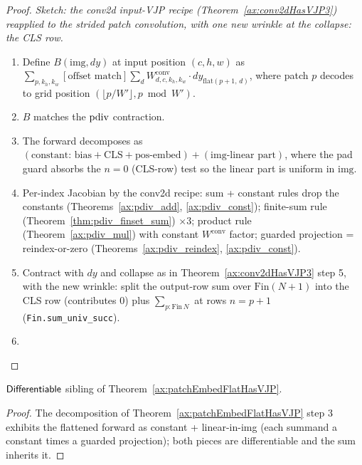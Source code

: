 \begin{proof}
\leanok
\emph{Sketch: the conv2d input-VJP recipe
(Theorem~\ref{ax:conv2dHasVJP3}) reapplied to the strided patch
convolution, with one new wrinkle at the collapse: the CLS row.}
\begin{enumerate}
  \item Define \(B(\mathrm{img}, dy)\) at input position
    \((c, h, w)\) as
    \(\sum_{p, k_h, k_w} [\text{offset match}]
      \sum_d W^{\mathrm{conv}}_{d, c, k_h, k_w} \cdot
        dy_{\mathrm{flat}(p + 1,\, d)}\),
    where patch \(p\) decodes to grid position
    \((\lfloor p / W' \rfloor, p \bmod W')\).
  \item \Suffices{} \(B\) matches the \(\operatorname{pdiv}\) contraction.
  \item The forward decomposes as
    \((\text{constant: bias} + \text{CLS} + \text{pos-embed}) +
      (\text{img-linear part})\), where the pad guard absorbs the
    \(n = 0\) (CLS-row) test so the linear part is uniform in
    \(\mathrm{img}\).
  \item Per-index Jacobian by the conv2d recipe: sum + constant
    rules drop the constants (Theorems~\ref{ax:pdiv_add},
    \ref{ax:pdiv_const}); finite-sum rule
    (Theorem~\ref{thm:pdiv_finset_sum}) \(\times 3\); product rule
    (Theorem~\ref{ax:pdiv_mul}) with constant \(W^{\mathrm{conv}}\)
    factor; guarded projection = reindex-or-zero
    (Theorems~\ref{ax:pdiv_reindex}, \ref{ax:pdiv_const}).
  \item Contract with \(dy\) and collapse as in
    Theorem~\ref{ax:conv2dHasVJP3} step 5, with the new wrinkle:
    split the output-row sum over \(\mathrm{Fin}(N{+}1)\) into the
    CLS row (contributes \(0\)) plus \(\sum_{p : \mathrm{Fin}\, N}\)
    at rows \(n = p + 1\) (\texttt{Fin.sum\_univ\_succ}).
  \item \Qed{}
\end{enumerate}
\end{proof}

\begin{theorem}
  \label{ax:patchEmbedFlat_differentiable}
  \leanok
  \(\mathsf{Differentiable}\) sibling of
  Theorem~\ref{ax:patchEmbedFlatHasVJP}.
\end{theorem}

\begin{proof}
\leanok
The decomposition of Theorem~\ref{ax:patchEmbedFlatHasVJP}
step 3 exhibits the flattened forward as constant + linear-in-img
(each summand a constant times a guarded projection); both pieces
are differentiable and the sum inherits it. \Qed{}
\end{proof}

